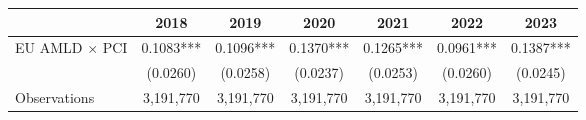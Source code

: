 \begin{tabular}{lcccccc}
\toprule
 & 2018 & 2019 & 2020 & 2021 & 2022 & 2023 \\
\midrule
EU AMLD $\times$ PCI & 0.1083*** & 0.1096*** & 0.1370*** & 0.1265*** & 0.0961*** & 0.1387*** \\
 & (0.0260) & (0.0258) & (0.0237) & (0.0253) & (0.0260) & (0.0245) \\
\midrule
Observations & 3,191,770 & 3,191,770 & 3,191,770 & 3,191,770 & 3,191,770 & 3,191,770 \\
\bottomrule
\end{tabular}